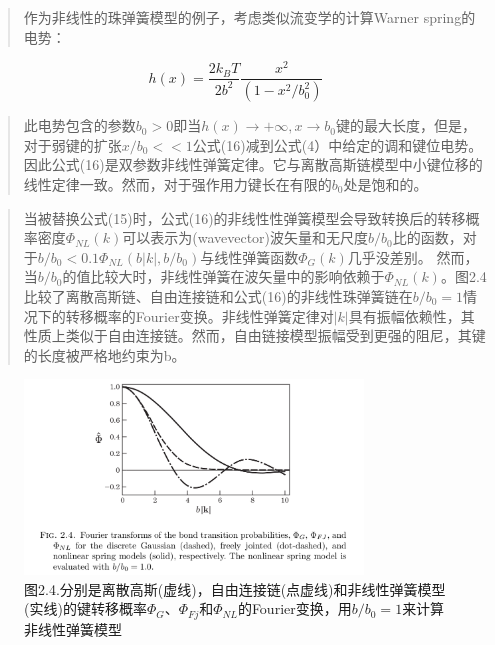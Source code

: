 \documentclass{article}
\begin{document}
\begin{sloppypar}
\begin{CJK}{UTF8}{gkai}
\begin{quotation}
			\end{quotation}
			\begin{quotation}
				作为非线性的珠弹簧模型的例子，考虑类似流变学的计算Warner spring的电势：
			\end{quotation}
			\begin{equation}
			h(x)=\frac{2k_{B}T}{2b^2}\frac{x^2}{(1-x^2/b_{0}^2)}
			\end{equation}
			\begin{quotation}
				此电势包含的参数$b_{0}>0$即当$h(x)\to +\infty,x\to b_{0}$键的最大长度，但是，对于弱键的扩张$x/b_{0}<<1$公式(16)减到公式(4）中给定的调和键位电势。因此公式(16)是双参数非线性弹簧定律。它与离散高斯链模型中小键位移的线性定律一致。然而，对于强作用力键长在有限的$b_{0}$处是饱和的。
			\end{quotation}
			\begin{quotation}
				当被替换公式(15)时，公式(16)的非线性性弹簧模型会导致转换后的转移概率密度$\varPhi_{NL}(k)$可以表示为(wavevector)波矢量和无尺度$b/b_{0}$比的函数，对于$b/b_{0}<0.1 \varPhi_{NL}(b|k|,b/b_{0})$与线性弹簧函数$\varPhi_{G}(k)$几乎没差别。 然而，
				当$b/b_{0}$的值比较大时，非线性弹簧在波矢量中的影响依赖于$\varPhi_{NL}(k)$。图2.4比较了离散高斯链、自由连接链和公式(16)的非线性珠弹簧链在$b/b_{0}=1$情况下的转移概率的Fourier变换。非线性弹簧定律对$|k|$具有振幅依赖性，其性质上类似于自由连接链。然而，自由链接模型振幅受到更强的阻尼，其键的长度被严格地约束为b。
			\end{quotation}
			\begin{figure}[ht]
				\caption{图2.4.分别是离散高斯(虚线)，自由连接链(点虚线)和非线性弹簧模型(实线)的键转移概率$\varPhi_{G}、\varPhi_{Fj}和\varPhi_{NL}$的Fourier变换，用$b/b_{0}=1$来计算非线性弹簧模型}
				\centering
				\includegraphics[width=9cm]{2.png}
			\end{figure}
		\end{CJK}
	\end{sloppypar}
\end{document}
